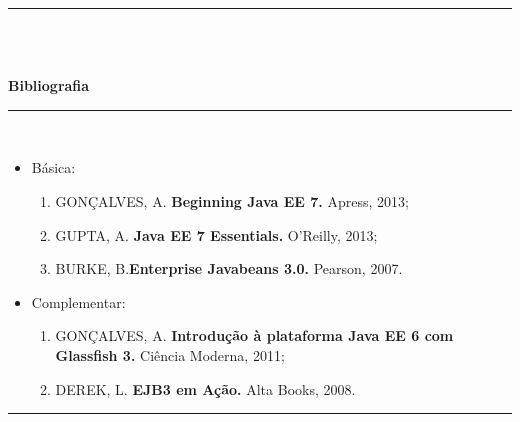 \noindent\rule{16.5cm}{0.4pt}\\
\\
\vspace{-12mm}
\begin{center}\textbf{Bibliografia}\end{center}
\vspace{-5mm}
\noindent\rule{16.5cm}{0.4pt}
\\
\begin{itemize} 
  \item Básica:
	\begin{enumerate}
  	\item 	GONÇALVES, A. \textbf{Beginning Java EE 7.} Apress, 2013;
	\item 	GUPTA, A. \textbf{Java EE 7 Essentials.} O’Reilly, 2013;
	\item 	BURKE, B.\textbf{Enterprise Javabeans 3.0.} Pearson, 2007. 
	\end{enumerate}
    
  \item Complementar:
	\begin{enumerate}
  	\item 	GONÇALVES, A. \textbf{Introdução à plataforma Java EE 6 com Glassfish 3.} Ciência Moderna, 2011;
	\item 	DEREK, L. \textbf{EJB3 em Ação.} Alta Books, 2008.
	\end{enumerate}
\end{itemize}
\noindent\rule{16.5cm}{0.4pt}\\
\\